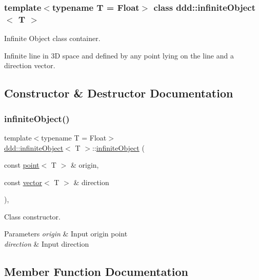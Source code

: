 \subsubsection*{template$<$typename T = Float$>$\newline
class ddd\+::infinite\+Object$<$ T $>$}

Infinite Object class container. 

Infinite line in 3D space and defined by any point lying on the line and a direction vector. 

\subsection{Constructor \& Destructor Documentation}
\mbox{\label{classddd_1_1infinite_object_aabf47275ecc4d586e9fd95102acee26c}} 
\subsubsection{\texorpdfstring{infinite\+Object()}{infiniteObject()}}
{\footnotesize\ttfamily template$<$typename T = Float$>$ \\
\hyperlink{classddd_1_1infinite_object}{ddd\+::infinite\+Object}$<$ T $>$\+::\hyperlink{classddd_1_1infinite_object}{infinite\+Object} (\begin{DoxyParamCaption}\item[{const \hyperlink{classddd_1_1point}{point}$<$ T $>$ \&}]{origin,  }\item[{const \hyperlink{classddd_1_1vector}{vector}$<$ T $>$ \&}]{direction }\end{DoxyParamCaption})\hspace{0.3cm}{\ttfamily [inline]}, {\ttfamily [protected]}}



Class constructor. 


\begin{DoxyParams}{Parameters}
{\em origin} & Input origin point \\
\hline
{\em direction} & Input direction \\
\hline
\end{DoxyParams}


\subsection{Member Function Documentation}
\mbox{\label{classddd_1_1infinite_object_a2145eca21c4505c11d19badc25faaf85}} 
